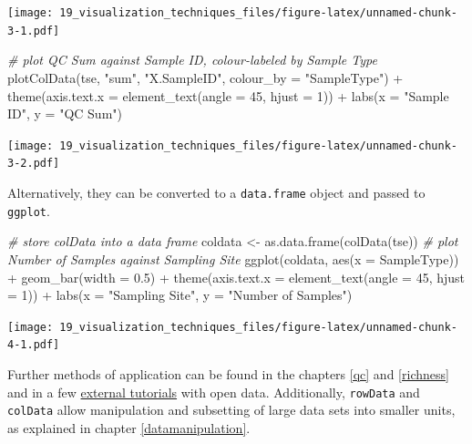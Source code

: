 \documentclass[
]{book}
\newenvironment{Shaded}{\begin{snugshade}}{\end{snugshade}}
\newcommand{\AttributeTok}[1]{\textcolor[rgb]{0.77,0.63,0.00}{#1}}
\newcommand{\CommentTok}[1]{\textcolor[rgb]{0.56,0.35,0.01}{\textit{#1}}}
\newcommand{\DecValTok}[1]{\textcolor[rgb]{0.00,0.00,0.81}{#1}}
\newcommand{\FloatTok}[1]{\textcolor[rgb]{0.00,0.00,0.81}{#1}}
\newcommand{\FunctionTok}[1]{\textcolor[rgb]{0.00,0.00,0.00}{#1}}
\newcommand{\NormalTok}[1]{#1}
\newcommand{\OtherTok}[1]{\textcolor[rgb]{0.56,0.35,0.01}{#1}}
\newcommand{\SpecialCharTok}[1]{\textcolor[rgb]{0.00,0.00,0.00}{#1}}
\newcommand{\StringTok}[1]{\textcolor[rgb]{0.31,0.60,0.02}{#1}}
\begin{document}
\texttt{[image: 19\_visualization\_techniques\_files/figure-latex/unnamed-chunk-3-1.pdf]}

\begin{Shaded}
\begin{Highlighting}[]
\CommentTok{\# plot QC Sum against Sample ID, colour{-}labeled by Sample Type}
\FunctionTok{plotColData}\NormalTok{(tse, }\StringTok{"sum"}\NormalTok{, }\StringTok{"X.SampleID"}\NormalTok{, }\AttributeTok{colour\_by =} \StringTok{"SampleType"}\NormalTok{) }\SpecialCharTok{+}
  \FunctionTok{theme}\NormalTok{(}\AttributeTok{axis.text.x =} \FunctionTok{element\_text}\NormalTok{(}\AttributeTok{angle =} \DecValTok{45}\NormalTok{, }\AttributeTok{hjust =} \DecValTok{1}\NormalTok{)) }\SpecialCharTok{+}
  \FunctionTok{labs}\NormalTok{(}\AttributeTok{x =} \StringTok{"Sample ID"}\NormalTok{, }\AttributeTok{y =} \StringTok{"QC Sum"}\NormalTok{)}
\end{Highlighting}
\end{Shaded}

\texttt{[image: 19\_visualization\_techniques\_files/figure-latex/unnamed-chunk-3-2.pdf]}

Alternatively, they can be converted to a \texttt{data.frame} object and
passed to \texttt{ggplot}.

\begin{Shaded}
\begin{Highlighting}[]
\CommentTok{\# store colData into a data frame}
\NormalTok{coldata }\OtherTok{\textless{}{-}} \FunctionTok{as.data.frame}\NormalTok{(}\FunctionTok{colData}\NormalTok{(tse))}
\CommentTok{\# plot Number of Samples against Sampling Site}
\FunctionTok{ggplot}\NormalTok{(coldata, }\FunctionTok{aes}\NormalTok{(}\AttributeTok{x =}\NormalTok{ SampleType)) }\SpecialCharTok{+}
  \FunctionTok{geom\_bar}\NormalTok{(}\AttributeTok{width =} \FloatTok{0.5}\NormalTok{) }\SpecialCharTok{+}
  \FunctionTok{theme}\NormalTok{(}\AttributeTok{axis.text.x =} \FunctionTok{element\_text}\NormalTok{(}\AttributeTok{angle =} \DecValTok{45}\NormalTok{, }\AttributeTok{hjust =} \DecValTok{1}\NormalTok{)) }\SpecialCharTok{+}
  \FunctionTok{labs}\NormalTok{(}\AttributeTok{x =} \StringTok{"Sampling Site"}\NormalTok{,}
       \AttributeTok{y =} \StringTok{"Number of Samples"}\NormalTok{)}
\end{Highlighting}
\end{Shaded}

\texttt{[image: 19\_visualization\_techniques\_files/figure-latex/unnamed-chunk-4-1.pdf]}

Further methods of application can be found in the chapters \ref{qc}
and \ref{richness} and in a few \href{https://github.com/davismcc/scater_tutorials_open_data}{external
tutorials}
with open data. Additionally, \texttt{rowData} and \texttt{colData} allow
manipulation and subsetting of large data sets into smaller units, as
explained in chapter \ref{datamanipulation}.
\end{document}
